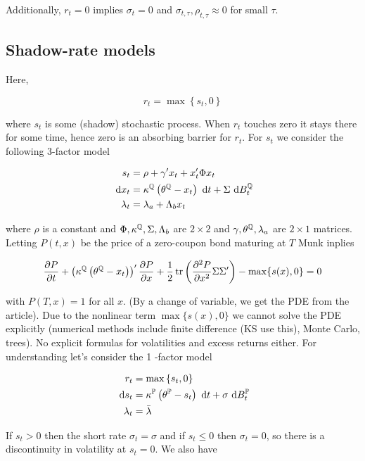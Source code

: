 Additionally, $r_{t}=0$ implies $\sigma_{t}=0$ and $\sigma_{t, \tau}, \rho_{t, \tau} \approx 0$ for small $\tau$.

\subsection{Shadow-rate models}
Here,

$$
r_{t}=\max \left\{s_{t}, 0\right\}
$$

where $s_{t}$ is some (shadow) stochastic process. When $r_{t}$ touches zero it stays there for some time, hence zero is an absorbing barrier for $r_{t}$. For $s_{t}$ we consider the following 3-factor model

$$
\begin{aligned}
s_{t} & =\rho+\gamma^{\prime} x_{t}+x_{t}^{\prime} \Phi x_{t} \\
\text{ d}  x_{t} & =\kappa^{\mathbb{Q}}\left(\theta^{\mathbb{Q}}-x_{t}\right) \text{ d}  t+\Sigma \text{ d}  B_{t}^{\mathbb{Q}} \\
\lambda_{t} & =\lambda_{a}+\Lambda_{b} x_{t}
\end{aligned}
$$

where $\rho$ is a constant and $\Phi, \kappa^{\mathbb{Q}}, \Sigma, \Lambda_{b}$ are $2 \times 2$ and $\gamma, \theta^{\mathbb{Q}}, \lambda_{a}$ are $2 \times 1$ matrices.\\
Letting $P(t, x)$ be the price of a zero-coupon bond maturing at $T$ Munk inplies

$$
\frac{\partial P}{\partial t}+\left(\kappa^{\mathbb{Q}}\left(\theta^{\mathbb{Q}}-x_{t}\right)\right)^{\prime} \frac{\partial P}{\partial x}+\frac{1}{2} \operatorname{tr}\left(\frac{\partial^{2} P}{\partial x^{2}} \Sigma \Sigma^{\prime}\right)-\max \{s(x), 0\}=0
$$

with $P(T, x)=1$ for all $x$. (By a change of variable, we get the PDE from the article). Due to the nonlinear term $\max \{s(x), 0\}$ we cannot solve the PDE explicitly (numerical methods include finite difference (KS use this), Monte Carlo, trees). No explicit formulas for volatilities and excess returns either. For understanding let's consider the 1 -factor model

$$
\begin{aligned}
r_{t} & =\max \left\{s_{t}, 0\right\} \\
\text{ d}  s_{t} & =\kappa^{\mathbb{P}}\left(\theta^{\mathbb{P}}-s_{t}\right) \text{ d}  t+\sigma \text{ d}  B_{t}^{\mathbb{P}} \\
\lambda_{t} & =\bar{\lambda}
\end{aligned}
$$

If $s_{t}>0$ then the short rate $\sigma_{t}=\sigma$ and if $s_{t} \leq 0$ then $\sigma_{t}=0$, so there is a discontinuity in volatility at $s_{t}=0$. We also have

